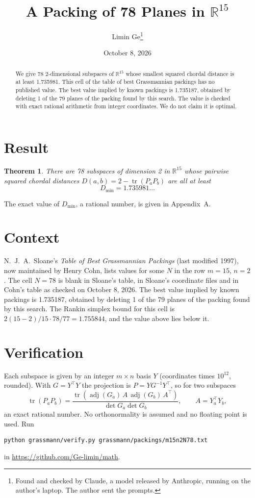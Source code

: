 \documentclass[11pt,a4paper]{article}
\title{A Packing of 78 Planes in $\mathbb{R}^{15}$}
\author{Limin Ge\thanks{Found and checked by Claude, a model released by Anthropic, running on the author's laptop. The author sent the prompts.}}
\date{October 8, 2026}
\newtheorem*{theorem}{Theorem}
\begin{document}
\maketitle
\begin{abstract}
We give 78 2-dimensional subspaces of $\mathbb{R}^{15}$ whose smallest squared chordal distance is at least 1.735981. This cell of the table of best Grassmannian packings has no published value. The best value implied by known packings is 1.735187, obtained by deleting 1 of the 79 planes of the packing found by this search. The value is checked with exact rational arithmetic from integer coordinates. We do not claim it is optimal.
\end{abstract}

\section{Result}
\begin{theorem}
There are 78 subspaces of dimension 2 in $\mathbb{R}^{15}$ whose pairwise squared chordal distances $D(a,b) = 2 - \operatorname{tr}(P_aP_b)$ are all at least
\[ D_{\min} = 1.735981\ldots \]
\end{theorem}
The exact value of $D_{\min}$, a rational number, is given in Appendix~A.


\section{Context}
N.~J.~A.~Sloane's \emph{Table of Best Grassmannian Packings} (last modified 1997), now maintained by Henry Cohn, lists values for some $N$ in the row $m=15$, $n=2$. The cell $N=78$ is blank in Sloane's table, in Sloane's coordinate files and in Cohn's table as checked on October 8, 2026. The best value implied by known packings is 1.735187, obtained by deleting 1 of the 79 planes of the packing found by this search. The Rankin simplex bound for this cell is $2(15-2)/15\cdot 78/77 = 1.755844$, and the value above lies below it.


\section{Verification}
Each subspace is given by an integer $m\times n$ basis $Y$ (coordinates times $10^{12}$, rounded). With $G=Y^\top Y$ the projection is $P=YG^{-1}Y^\top$, so for two subspaces
\[ \operatorname{tr}(P_aP_b)=\frac{\operatorname{tr}(\operatorname{adj}(G_a)\,A\,\operatorname{adj}(G_b)\,A^\top)}{\det G_a\det G_b},\qquad A=Y_a^\top Y_b, \]
an exact rational number. No orthonormality is assumed and no floating point is used. Run
\begin{verbatim}
python grassmann/verify.py grassmann/packings/m15n2N78.txt
\end{verbatim}
in \url{https://github.com/Ge-limin/math}.
\end{document}
